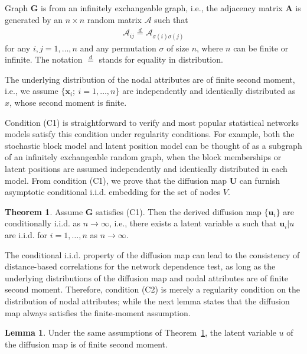 \documentclass[11pt]{article}
\theoremstyle{definition}
\newtheorem{theorem}{Theorem}
\newtheorem{lemma}{Lemma}
\begin{document}
\begin{description}[align=left]
\item [(C1)] Graph $\mathbf{G}$ is from an infinitely exchangeable graph, i.e., the adjacency matrix $\mathbf{A}$ is generated by an $n \times n$ random matrix $\mathcal{A}$ such that 
\begin{align*}
\mathcal{A}_{ij} \stackrel{d}{=} \mathcal{A}_{\sigma(i) \sigma(j)}
\end{align*}
for any $i,j=1,\ldots,n$ and any permutation $\sigma$ of size $n$, where $n$ can be finite or infinite. The notation $\stackrel{d}{=}$ stands for equality in distribution. 

\item [(C2)] The underlying distribution of the nodal attributes are of finite second moment, i.e., we assume $\{\mathbf{x}_{i};~i=1,\ldots,n\}$ are independently and identically distributed as $x$, whose second moment is finite.
\end{description}

Condition (C1) is straightforward to verify and most popular statistical networks models satisfy this condition under regularity conditions. For example, both the stochastic block model and latent position model can be thought of as a subgraph of an infinitely exchangeable random graph, when the block memberships or latent positions are assumed independently and identically distributed in each model. From condition (C1), we prove that the diffusion map $\mathbf{U}$ can furnish asymptotic conditional i.i.d. embedding for the set of nodes $V$. 

\begin{theorem}
	\label{main_lemma}
	Assume $\mathbf{G}$ satisfies (C1). Then the derived diffusion map $\{ \mathbf{u}_{i}\}$ are conditionally i.i.d. as $n \rightarrow \infty$,  i.e., there exists a latent variable $u$ such that $\mathbf{u}_{i}|u$ are i.i.d. for $i=1,\ldots,n$ as $n \rightarrow \infty$.  
\end{theorem} 

The conditional i.i.d. property of the diffusion map can lead to the consistency of distance-based correlations for the network dependence test, as long as the underlying distributions of the diffusion map and nodal attributes are of finite second moment. Therefore, condition (C2) is merely a regularity condition on the distribution of nodal attributes; while the next lemma states that the diffusion map always satisfies the finite-moment assumption.

\begin{lemma}
	\label{main_lemma_1}
    Under the same assumptions of Theorem~\ref{main_lemma}, the latent variable $u$ of the diffusion map is of finite second moment. 
\end{lemma} 
\end{document}
